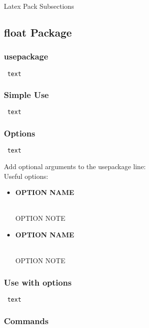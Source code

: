 \documentclass[class=article , crop=false, titlepage, twoside, multi={itemize, figure, verbatim}, float=false]{standalone}
\title{}  %
\begin{document}
\ifstandalone
\maketitle %
\clearpage
\tableofcontents %
\clearpage
\fi

\clearpage

Latex Pack Subsections

\subsection[float Package]{\LARGE float Package}

\subsubsection[usepackage]{\Large usepackage}
\begin{verbatim} text \end{verbatim}

\subsubsection[Simple Use]{\Large Simple Use}
\begin{verbatim} text \end{verbatim}

\subsubsection[Options]{\Large Options}
\begin{verbatim} text \end{verbatim}
Add optional arguments to the usepackage line:\\
Useful options:\begin{itemize}
\item \begin{large}\textbf{OPTION NAME}\end{large}\\OPTION NOTE
\item \begin{large}\textbf{OPTION NAME}\end{large}\\OPTION NOTE
\end{itemize}

\subsubsection[Use with Options]{\Large Use with options}
\begin{verbatim} text \end{verbatim}

\subsubsection[Commands]{\Large Commands}
\end{document}
